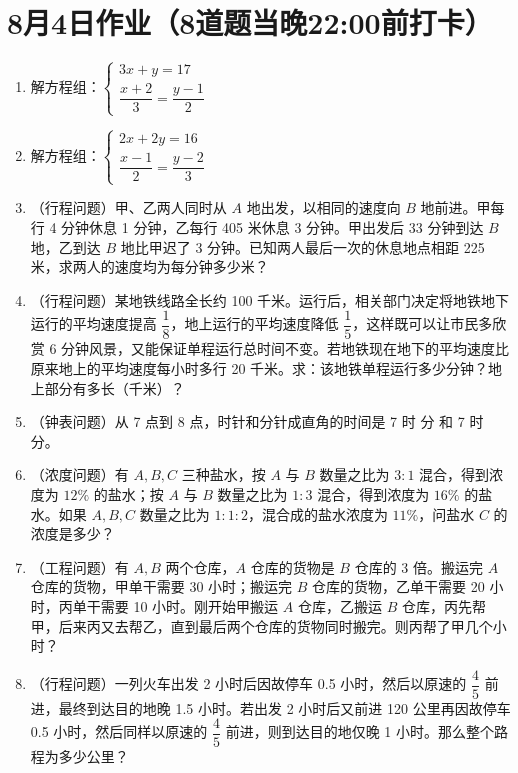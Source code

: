 \documentclass[UTF8,12pt,a4paper]{ctexart}
\newcommand{\BottomWriteSpace}{0.5cm}
\newenvironment{OnePageEightFill}{
  \small
  \vspace*{0pt}
  \begin{enumerate}[leftmargin=*, itemsep=0pt, topsep=0pt, parsep=0pt, partopsep=0pt]
  \setlength{\parskip}{0pt}
}{
  \end{enumerate}
  \vspace*{\BottomWriteSpace}
  \normalsize
  \newpage
}
\newcommand{\Q}[1]{\item #1\par\vfill}
\newcommand{\Qlast}[1]{\item #1\par}
\begin{document}
\section*{8月4日作业（8道题当晚22:00前打卡）}
\begin{OnePageEightFill}

\Q{解方程组：$\begin{cases} 3x + y = 17 \\ \dfrac{x+2}{3} = \dfrac{y-1}{2} \end{cases}$}

\Q{解方程组：$\begin{cases} 2x + 2y = 16 \\ \dfrac{x-1}{2} = \dfrac{y-2}{3} \end{cases}$}

\Q{（行程问题）甲、乙两人同时从 $A$ 地出发，以相同的速度向 $B$ 地前进。甲每行 4 分钟休息 1 分钟，乙每行 405 米休息 3 分钟。甲出发后 33 分钟到达 $B$ 地，乙到达 $B$ 地比甲迟了 3 分钟。已知两人最后一次的休息地点相距 225 米，求两人的速度均为每分钟多少米？}

\Q{（行程问题）某地铁线路全长约 100 千米。运行后，相关部门决定将地铁地下运行的平均速度提高 $\dfrac{1}{8}$，地上运行的平均速度降低 $\dfrac{1}{5}$，这样既可以让市民多欣赏 6 分钟风景，又能保证单程运行总时间不变。若地铁现在地下的平均速度比原来地上的平均速度每小时多行 20 千米。求：该地铁单程运行多少分钟？地上部分有多长（千米）？}

\Q{（钟表问题）从 7 点到 8 点，时针和分针成直角的时间是 7 时 \underline{\hspace{3em}} 分 和 7 时 \underline{\hspace{3em}} 分。}

\Q{（浓度问题）有 $A, B, C$ 三种盐水，按 $A$ 与 $B$ 数量之比为 $3:1$ 混合，得到浓度为 $12\%$ 的盐水；按 $A$ 与 $B$ 数量之比为 $1:3$ 混合，得到浓度为 $16\%$ 的盐水。如果 $A, B, C$ 数量之比为 $1:1:2$，混合成的盐水浓度为 $11\%$，问盐水 $C$ 的浓度是多少？}

\Q{（工程问题）有 $A, B$ 两个仓库，$A$ 仓库的货物是 $B$ 仓库的 3 倍。搬运完 $A$ 仓库的货物，甲单干需要 30 小时；搬运完 $B$ 仓库的货物，乙单干需要 20 小时，丙单干需要 10 小时。刚开始甲搬运 $A$ 仓库，乙搬运 $B$ 仓库，丙先帮甲，后来丙又去帮乙，直到最后两个仓库的货物同时搬完。则丙帮了甲几个小时？}

\Qlast{（行程问题）一列火车出发 2 小时后因故停车 0.5 小时，然后以原速的 $\dfrac{4}{5}$ 前进，最终到达目的地晚 1.5 小时。若出发 2 小时后又前进 120 公里再因故停车 0.5 小时，然后同样以原速的 $\dfrac{4}{5}$ 前进，则到达目的地仅晚 1 小时。那么整个路程为多少公里？}

\end{OnePageEightFill}
\end{document}
